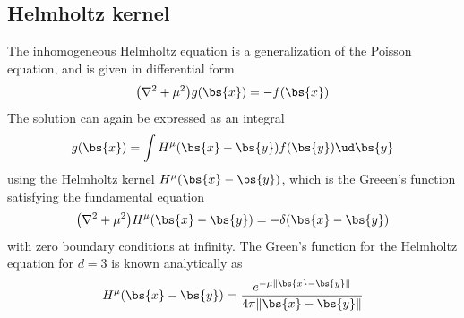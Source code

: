 \subsection{Helmholtz kernel}
The inhomogeneous Helmholtz equation is a generalization of the Poisson equation,
and is given in differential form
\begin{equation}
    \big(\nabla^2 + \mu^2\big) g(\bs{x}) = -f(\bs{x})
\end{equation}
The solution can again be expressed as an integral
\begin{equation}
    g(\bs{x}) = \int H^\mu(\bs{x}-\bs{y})f(\bs{y})\ud\bs{y}
\end{equation}
using the Helmholtz kernel $H^\mu(\bs{x}-\bs{y})$, which is the Greeen's function 
satisfying the fundamental equation
\begin{equation}
    \label{eq:fundamental_helmholtz}
    \big(\nabla^2 + \mu^2\big) H^\mu(\bs{x}-\bs{y}) = -\delta(\bs{x}-\bs{y})
\end{equation}
with zero boundary conditions at infinity. The Green's function for the Helmholtz 
equation for $d=3$ is known analytically as
\begin{equation}
    \label{eq:helmholtz_kern}
    H^\mu(\bs{x}-\bs{y}) = \frac{e^{-\mu\|\bs{x}-\bs{y}\|}}{4\pi\|\bs{x}-\bs{y}\|}
\end{equation}

